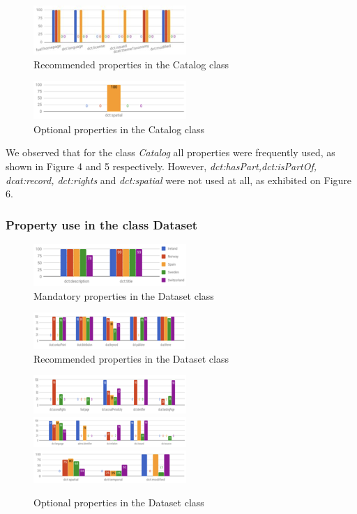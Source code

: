 \documentclass[<options>]{elsarticle}
\begin{document}
\begin{figure}[H]
\includegraphics{replace5.png}
\caption{Recommended properties in the Catalog class}
\end{figure}

\begin{figure}[H]
\includegraphics{Replace6.png}
\caption{Optional properties in the Catalog class}
\end{figure}

We observed that for the class \textit{Catalog} all properties were frequently used, as shown in Figure 4 and 5 respectively. However, \textit{dct:hasPart,dct:isPartOf, dcat:record, dct:rights} and \textit{dct:spatial} were not used at all, as exhibited on Figure 6.

\subsubsection{Property use in the class Dataset}

\begin{figure}[H]
\includegraphics{replace7.png}
\caption{Mandatory properties in the Dataset class}
\end{figure}

\begin{figure}[H]
\includegraphics{replace8.png}
\caption{Recommended properties in the Dataset class}
\end{figure}

\begin{figure}[H]
\includegraphics{replace9.png}
\includegraphics{replace10.png}
\includegraphics{replace11.png}
\caption{Optional properties in the Dataset class}
\end{figure}
\end{document}
